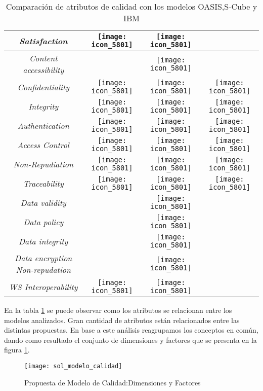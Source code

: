 \begin{table}[h]
\begin{tabular}{ |c | c | c  | c|}
	\hline
     	\emph{Satisfaction} & 
		\texttt{[image: icon\_5801]} & 
		\texttt{[image: icon\_5801]} & \\		
	\hline
     	\emph{Content accessibility} & & 
		\texttt{[image: icon\_5801]} & \\
	\hline
	\hline
     	\emph{Confidentiality} & 
		\texttt{[image: icon\_5801]} & 
		\texttt{[image: icon\_5801]} & 
		\texttt{[image: icon\_5801]} \\
	\hline
     	\emph{Integrity} & 
		\texttt{[image: icon\_5801]} & 
		\texttt{[image: icon\_5801]} & 
		\texttt{[image: icon\_5801]} \\
	\hline
     	\emph{Authentication} & 
		\texttt{[image: icon\_5801]} & 
		\texttt{[image: icon\_5801]} & 
		\texttt{[image: icon\_5801]} \\
	\hline
     	\emph{Access Control} & 
		\texttt{[image: icon\_5801]} & 
		\texttt{[image: icon\_5801]} & 
		\texttt{[image: icon\_5801]} \\
	\hline
     	\emph{Non-Repudiation} & 
		\texttt{[image: icon\_5801]} & 
		\texttt{[image: icon\_5801]} & 
		\texttt{[image: icon\_5801]} \\
	\hline    
     	\emph{Traceability} & 
		\texttt{[image: icon\_5801]} & 
		\texttt{[image: icon\_5801]} & 
		\texttt{[image: icon\_5801]} \\	
	\hline
	\hline	
	  	\emph{Data validity} &  & 
		\texttt{[image: icon\_5801]} &  \\	
	\hline	  
	 	\emph{Data policy} &  & 
		\texttt{[image: icon\_5801]} &  \\
	\hline	
	  	\emph{Data integrity} &  & 
		\texttt{[image: icon\_5801]} &  \\
	\hline	
	   \emph{Data encryption Non-repudation} &  & 
		\texttt{[image: icon\_5801]} &  \\	
	\hline
	\hline
     	\emph{WS Interoperability} & 
		\texttt{[image: icon\_5801]} & 
		\texttt{[image: icon\_5801]} &  \\	
	 \hline
    \end{tabular}
    \caption{Comparación de atributos de calidad con los modelos OASIS,S-Cube y IBM}
    \label{tabla:comparacion_atributos}
  \end{table}
  
En la tabla \ref{tabla:comparacion_atributos} se puede observar como los atributos se relacionan entre los modelos analizados. Gran cantidad de atributos están relacionados entre las distintas propuestas. En base a este análisis reagrupamos los conceptos en común, dando como resultado el conjunto de dimensiones y factores que se presenta en la figura \ref{figura:sol_mod_calidad}.
  \begin{figure}[h]
    \centering
    \texttt{[image: sol\_modelo\_calidad]}
    \caption{Propuesta de Modelo de Calidad:Dimensiones y Factores}
    \label{figura:sol_mod_calidad}
  \end{figure}

